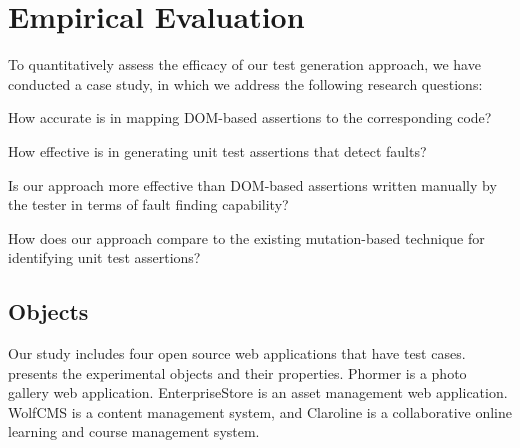 \section{Empirical Evaluation} \label{Sec:evaluation}
To quantitatively assess the efficacy of our test generation approach, we have conducted a case study, in which we address the following research questions:

\begin{description}[noitemsep]
\item [RQ1] How accurate is \atrina in mapping DOM-based assertions to the corresponding \javascript code?
\item [RQ2] How effective is \atrina in generating unit test assertions that detect faults?
\item [RQ3] Is our approach more effective than DOM-based assertions written manually by the tester in terms of fault finding capability? 
\item [RQ4] How does our approach compare to the existing mutation-based technique for identifying unit test assertions?
\end{description}

\subsection{Objects}
Our study includes four open source \javascript web applications that have \selenium test cases.
 presents the experimental objects and their properties. Phormer \cite{phormer} is a photo gallery web application. EnterpriseStore \cite{enterpriseStore} is an asset management web application. WolfCMS \cite{wolfcms} is a content management system, and Claroline \cite{claroline} is a collaborative online learning and course management system. 


